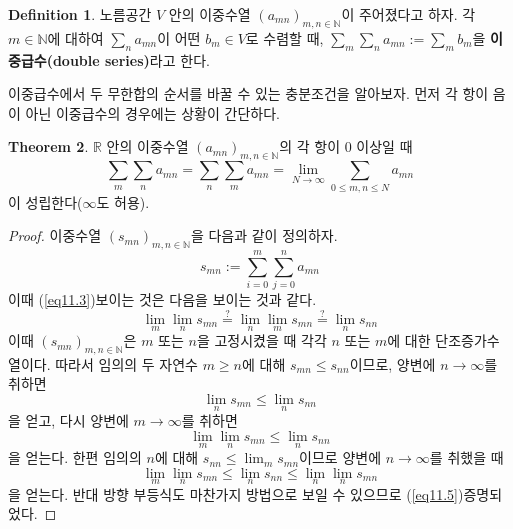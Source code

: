 \documentclass[11pt]{book}
\numberwithin{equation}{chapter}
\def\NN{\mathbb{N}}
\def\RR{\mathbb{R}}
\theoremstyle{definition}
\newtheorem{thm}{Theorem}[section]
\newtheorem{defn}[thm]{Definition}
\begin{document}
\begin{defn}
    노름공간 \(V\) 안의 이중수열 \((a_{mn})_{m, n \in \NN}\)이 주어졌다고 하자. 각 \(m \in \NN\)에 대하여 \(\sum_n a_{mn}\)이 어떤 \(b_m \in V\)로 수렴할 때, \(\sum_m \sum_n a_{mn} := \sum_m b_m\)을 \textbf{이중급수(double series)}라고 한다.
\end{defn}

이중급수에서 두 무한합의 순서를 바꿀 수 있는 충분조건을 알아보자. 먼저 각 항이 음이 아닌 이중급수의 경우에는 상황이 간단하다.

\begin{thm}
    \(\RR\) 안의 이중수열 \((a_{mn})_{m,n\in \NN}\)의 각 항이 0 이상일 때
    \begin{equation} \label{eq11.3}
        \sum_m \sum_n a_{mn} = \sum_n \sum_m a_{mn} = \lim_{N \to \infty} \sum_{0 \le m, n \le N} a_{mn}    
    \end{equation}
    이 성립한다(\(\infty\)도 허용).
\end{thm}
\begin{proof}
    이중수열 \((s_{mn})_{m,n \in \NN}\)을 다음과 같이 정의하자.
    \begin{equation} \label{eq11.4}
        s_{mn} := \sum_{i=0}^m \sum_{j=0}^n a_{mn}  
    \end{equation}
    이때 (\ref{eq11.3})\을 보이는 것은 다음을 보이는 것과 같다.
    \begin{equation} \label{eq11.5}
        \lim_m \lim_n s_{mn} \stackrel{?}{=} \lim_{n} \lim_m s_{mn} \stackrel{?}{=} \lim_{n} s_{nn}
    \end{equation}
    이때 \((s_{mn})_{m, n \in \NN}\)은 \(m\) 또는 \(n\)을 고정시켰을 때 각각 \(n\) 또는 \(m\)에 대한 단조증가수열이다. 따라서 임의의 두 자연수 \(m \ge n\)에 대해 \(s_{mn} \le s_{nn}\)이므로, 양변에 \(n \to \infty\)를 취하면
    \[
        \lim_n s_{mn} \le \lim_n s_{nn}    
    \]
    을 얻고, 다시 양변에 \(m \to \infty\)를 취하면
    \[
        \lim_m \lim_n s_{mn} \le \lim_n s_{nn}
    \]
    을 얻는다. 한편 임의의 \(n\)에 대해 \(s_{nn} \le \lim_m s_{mn}\)이므로 양변에 \(n \to \infty\)를 취했을 때
    \[
        \lim_m \lim_n s_{mn} \le \lim_n s_{nn} \le \lim_n \lim_n s_{mn}
    \]
    을 얻는다. 반대 방향 부등식도 마찬가지 방법으로 보일 수 있으므로 (\ref{eq11.5})\가 증명되었다.
\end{proof}
\end{document}

